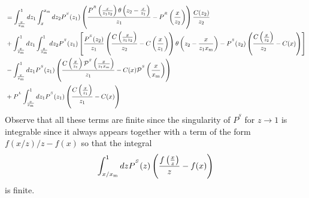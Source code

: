 \documentclass[a4paper]{article}
\newcommand{\PR}[0]{P^{^R}}
\newcommand{\PS}[0]{P^{^S}}
\newcommand{\PmS}[0]{\mathcal{P}^{^S}}
\newcommand{\PL}[0]{P^{^L}}
\newcommand{\xm}[0]{x_{\rm m}}
\newcommand{\zo}[0]{{z_1}}
\newcommand{\zt}[0]{{z_2}}
\begin{document}
\begin{equation*}
	\begin{split}
		&= \int_{\frac{x}{\xm}}^1dz_1 \int_x^{\xm}dz_2\PS(\zo)\left(\frac{\PR\left(\frac{x}{\zo \zt}\right)\theta\left(\zt-\frac{x}{\zo}\right)}{\zo} - \PR\left(\frac{x}{\zt} \right)\right)\frac{C(\zt)}{\zt} \\
		&+\int_{\frac{x}{\xm}}^1dz_1 \int_{\frac{x}{\xm}}^1dz_2 \PS(\zo) \left[ \frac{\PS(\zt)}{\zo}\left(\frac{C\left(\frac{x}{\zo \zt}\right)}{\zt}-C\left(\frac{x}{\zo}\right) \right)\theta\left(\zt - \frac{x}{\zo \xm}\right) - \PS(\zt)\left(\frac{C\left(\frac{x}{\zt}\right)}{\zt}-C(x) \right)\right] \\
		&- \int_\frac{x}{\xm}^1 d\zo\PS(\zo)\left(\frac{C\left(\frac{x}{\zo}\right)\PmS\left(\frac{x}{\zo \xm}\right)}{\zo} - C(x) \PmS\left(\frac{x}{\xm}\right) \right) \\
		&+\PL \int_\frac{x}{\xm}^1 d\zo \PS(\zo)\left(\frac{C\left(\frac{x}{\zo}\right)}{\zo}-C(x)\right)
	\end{split}
\end{equation*}
Observe that all these terms  are finite since the singularity of $\PS$ for $z \rightarrow 1$ is integrable since it always appears together with a term of the form $f(x/z) /z-f(x)$ so that the integral
\begin{equation*}
	\int_{x/\xm}^1dz\PS(z)\left(\frac{f\left(\frac{x}{z}\right)}{z}-f(x)\right)
\end{equation*}
is finite.
\end{document}
